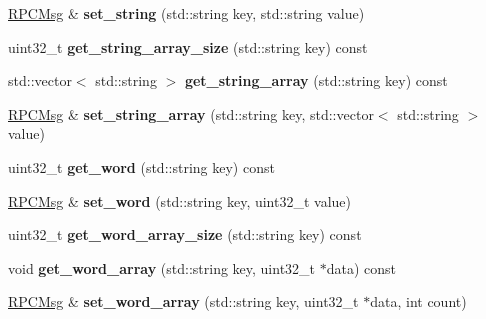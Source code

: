 \begin{DoxyCompactItemize}
\item 
\hypertarget{classwisc_1_1RPCMsg_aff7ff024e7941776990c6280fd6c4c7d}{
\hyperlink{classwisc_1_1RPCMsg}{RPCMsg} \& {\bfseries set\_\-string} (std::string key, std::string value)}
\label{classwisc_1_1RPCMsg_aff7ff024e7941776990c6280fd6c4c7d}

\item 
\hypertarget{classwisc_1_1RPCMsg_a2fe19359bc4e8e2546227b3466ed236b}{
uint32\_\-t {\bfseries get\_\-string\_\-array\_\-size} (std::string key) const }
\label{classwisc_1_1RPCMsg_a2fe19359bc4e8e2546227b3466ed236b}

\item 
\hypertarget{classwisc_1_1RPCMsg_a6435d51f35a512c06426540cbec683b1}{
std::vector$<$ std::string $>$ {\bfseries get\_\-string\_\-array} (std::string key) const }
\label{classwisc_1_1RPCMsg_a6435d51f35a512c06426540cbec683b1}

\item 
\hypertarget{classwisc_1_1RPCMsg_a5370bf8de3ee8696cad024a0d5d50f28}{
\hyperlink{classwisc_1_1RPCMsg}{RPCMsg} \& {\bfseries set\_\-string\_\-array} (std::string key, std::vector$<$ std::string $>$ value)}
\label{classwisc_1_1RPCMsg_a5370bf8de3ee8696cad024a0d5d50f28}

\item 
\hypertarget{classwisc_1_1RPCMsg_a0de744ed1c7ec8335e4e10a620160770}{
uint32\_\-t {\bfseries get\_\-word} (std::string key) const }
\label{classwisc_1_1RPCMsg_a0de744ed1c7ec8335e4e10a620160770}

\item 
\hypertarget{classwisc_1_1RPCMsg_a1d63bf3247d747beae100ef7d3e5d891}{
\hyperlink{classwisc_1_1RPCMsg}{RPCMsg} \& {\bfseries set\_\-word} (std::string key, uint32\_\-t value)}
\label{classwisc_1_1RPCMsg_a1d63bf3247d747beae100ef7d3e5d891}

\item 
\hypertarget{classwisc_1_1RPCMsg_a62e57061a1078806a35de1b69431eae5}{
uint32\_\-t {\bfseries get\_\-word\_\-array\_\-size} (std::string key) const }
\label{classwisc_1_1RPCMsg_a62e57061a1078806a35de1b69431eae5}

\item 
\hypertarget{classwisc_1_1RPCMsg_a74a53d5a2a06f4256ba2f7260ad4643c}{
void {\bfseries get\_\-word\_\-array} (std::string key, uint32\_\-t $\ast$data) const }
\label{classwisc_1_1RPCMsg_a74a53d5a2a06f4256ba2f7260ad4643c}

\item 
\hypertarget{classwisc_1_1RPCMsg_a4be8935278025d45af5bc8e63a61914a}{
\hyperlink{classwisc_1_1RPCMsg}{RPCMsg} \& {\bfseries set\_\-word\_\-array} (std::string key, uint32\_\-t $\ast$data, int count)}
\label{classwisc_1_1RPCMsg_a4be8935278025d45af5bc8e63a61914a}


\end{DoxyCompactItemize}
